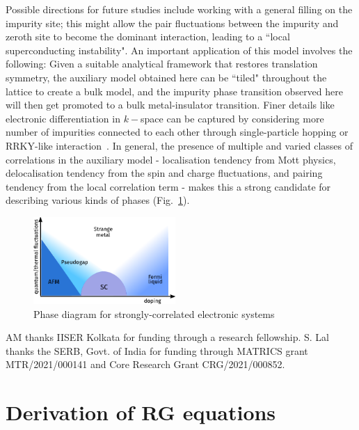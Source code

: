 \documentclass[reprint,superscriptaddress,floatfix]{revtex4-2}
\begin{document}
Possible directions for future studies include working with a general filling on the impurity site; this might allow the pair fluctuations between the impurity and zeroth site to become the dominant interaction, leading to a ``local superconducting instability".
An important application of this model involves the following: Given a suitable analytical framework that restores translation symmetry, the auxiliary model obtained here can be ``tiled" throughout the lattice to create a bulk model, and the impurity phase transition observed here will then get promoted to a bulk metal-insulator transition.
Finer details like electronic differentiation in \(k-\)space can be captured by considering more number of impurities connected to each other through single-particle hopping or RRKY-like interaction~\cite{Ferrero2007,sakai_2009}.
In general, the presence of multiple and varied classes of correlations in the auxiliary model - localisation tendency from Mott physics, delocalisation tendency from the spin and charge fluctuations, and pairing tendency from the local correlation term - makes this a strong candidate for describing various kinds of phases (Fig.~\ref{universal}).

\begin{figure}[htpb]
	\centering
	\includegraphics[width=0.48\textwidth]{universal_phase_diagram.pdf}
	\caption{Phase diagram for strongly-correlated electronic systems}
	\label{universal}
\end{figure}


\acknowledgments
AM thanks IISER Kolkata for funding through a research fellowship. S. Lal thanks the SERB, Govt. of India for funding through MATRICS grant MTR/2021/000141 and Core Research Grant CRG/2021/000852.



\appendix*

\section{Derivation of RG equations}
\end{document}
